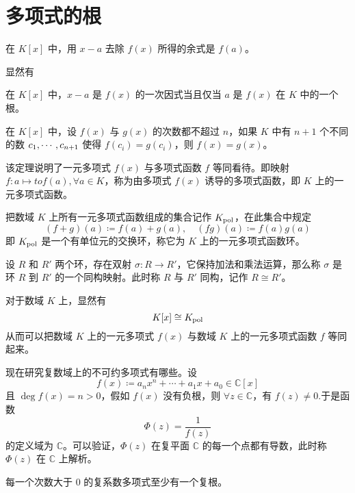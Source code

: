 \section{多项式的根}

\begin{theorem}
	在 $K[x]$ 中，用 $x-a$ 去除 $f(x)$ 所得的余式是 $f(a)$。
\end{theorem}

显然有

\begin{theorem}[Bezout 定理]
	在 $K[x]$ 中，$x-a$ 是 $f(x)$ 的一次因式当且仅当 $a$ 是 $f(x)$ 在 $K$ 中的一个根。
\end{theorem}

\begin{theorem}
	在 $K[x]$ 中，设 $f(x)$ 与 $g(x)$ 的次数都不超过 $n$，如果 $K$ 中有 $n+1$ 个不同的数 $c_1,\cdots,c_{n+1}$ 使得 $f(c_i) = g(c_i)$，则 $f(x) = g(x)$。
\end{theorem}

该定理说明了一元多项式 $f(x)$ 与多项式函数 $f$ 等同看待。即映射 $f : a \mapsto to f(a), \forall a \in K$，称为由多项式 $f(x)$ 诱导的多项式函数，即 $K$ 上的一元多项式函数。

把数域 $K$ 上所有一元多项式函数组成的集合记作 $K_{\rm pol}$，在此集合中规定
\[ (f+g)(a) \coloneqq  f(a) + g(a), \quad (fg)(a) \coloneqq  f(a)g(a) \]
即 $K_{\rm pol}$ 是一个有单位元的交换环，称它为 $K$ 上的一元多项式函数环。

\begin{definition}
	设 $R$ 和 $R'$ 两个环，存在双射 $\sigma : R \to R'$，它保持加法和乘法运算，那么称 $\sigma$ 是环 $R$ 到 $R'$ 的一个同构映射。此时称 $R$ 与 $R'$ 同构，记作 $R \cong R'$。
\end{definition}

对于数域 $K$ 上，显然有
\[K[x] \cong K_{\rm pol}\]
从而可以把数域 $K$ 上的一元多项式 $f(x)$ 与数域 $K$ 上的一元多项式函数 $f$ 等同起来。

现在研究复数域上的不可约多项式有哪些。设
\[f(x) \coloneqq a_nx^n + \cdots + a_1x + a_0 \in \mathbb{C}[x]\]
且 $\deg f(x) = n > 0$，假如 $f(x)$ 没有负根，则 $\forall z \in \mathbb{C}$，有 $f(z) \ne 0$.于是函数
\[\Phi(z) = \frac{1}{f(z)}\]
的定义域为 $\mathbb{C}$。可以验证，$\Phi(z)$ 在复平面 $\mathbb{C}$ 的每一个点都有导数，此时称 $\Phi(z)$ 在 $\mathbb{C}$ 上解析。

\begin{theorem}[代数基本定理]
	每一个次数大于 $0$ 的复系数多项式至少有一个复根。
\end{theorem}

